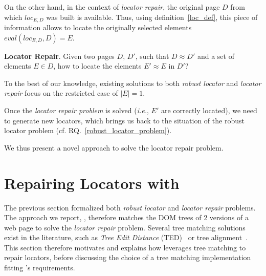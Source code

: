 On the other hand, in the context of \textit{locator repair}, the original page $D$ from which $loc_{E,D}$ was built is available.
Thus, using definition~\ref{loc_def}, this piece of information allows to locate the originally selected elements $eval(loc_{E,D}, D) = E$.

\begin{rqn}\label{locator_repair_problem}
    \textbf{Locator Repair}. 
    Given two pages $D$, $D'$, such that $D \approx D'$ and a set of elements $E\in D$, how to locate the elements $E' \approx E$ in $D'$?
\end{rqn}
To the best of our knowledge, existing solutions to both \emph{robust locator} and \emph{locator repair} focus on the restricted case of $|E| = 1$.

Once the \textit{locator repair problem} is solved (\emph{i.e.}, $E'$ are correctly located), we need to generate new locators, which brings us back to the situation of the robust locator problem (cf. RQ.~\ref{robust_locator_problem}).

We thus present a novel approach to solve the locator repair problem.


\section{Repairing Locators with \erratum}\label{erratum:sec:implementation}
The previous section formalized both \emph{robust locator} and \emph{locator repair} problems.
The approach we report, \erratum, therefore matches the DOM trees of 2 versions of a web page to solve the \emph{locator repair} problem.
Several tree matching solutions exist in the literature, such as \emph{Tree Edit Distance} (TED)~\cite{tai1979tree} or tree alignment~\cite{jiang1994alignment}.
This section therefore motivates and explains how \erratum leverages tree matching to repair locators, before discussing the choice of a tree matching implementation fitting \erratum's requirements.


